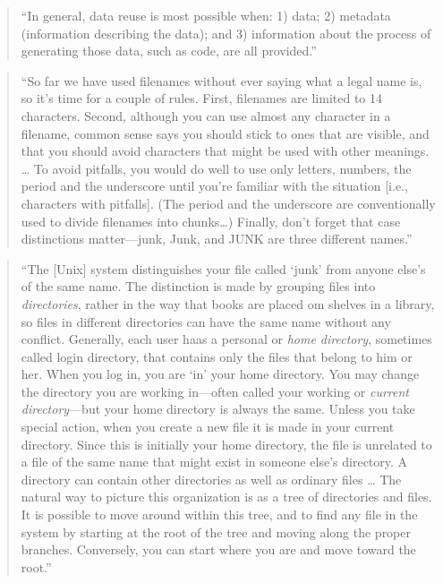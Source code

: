 \documentclass[]{tufte-book}
\begin{document}
\begin{quote}
``In general, data reuse is most possible when: 1) data; 2) metadata (information
describing the data); and 3) information about the process of generating those data,
such as code, are all provided.'' \citep{goodman2014ten}
\end{quote}

\begin{quote}
``So far we have used filenames without ever saying what a legal name is, so it's time for a couple
of rules. First, filenames are limited to 14 characters. Second, although you can use almost any
character in a filename, common sense says you should stick to ones that are visible, and that you
should avoid characters that might be used with other meanings. \ldots{} To avoid pitfalls, you would
do well to use only letters, numbers, the period and the underscore until you're familiar with the
situation {[}i.e., characters with pitfalls{]}. (The period and the underscore are conventionally used
to divide filenames into chunks\ldots{}) Finally, don't forget that case distinctions matter---junk, Junk,
and JUNK are three different names.'' \citep{kernighan1984unix}
\end{quote}

\begin{quote}
``The {[}Unix{]} system distinguishes your file called `junk' from anyone else's of the same name. The
distinction is made by grouping files into \emph{directories}, rather in the way that books are placed om
shelves in a library, so files in different directories can have the same name without any conflict.
Generally, each user haas a personal or \emph{home directory}, sometimes called login directory, that
contains only the files that belong to him or her. When you log in, you are `in' your home directory.
You may change the directory you are working in---often called your working or \emph{current directory}---but
your home directory is always the same. Unless you take special action, when you create a new file it is
made in your current directory. Since this is initially your home directory, the file is unrelated
to a file of the same name that might exist in someone else's directory. A directory can contain
other directories as well as ordinary files \ldots{} The natural way to picture this organization is as a
tree of directories and files. It is possible to move around within this tree, and to find any file in the system
by starting at the root of the tree and moving along the proper branches. Conversely, you can start where
you are and move toward the root.'' \citep{kernighan1984unix}
\end{quote}
\end{document}
